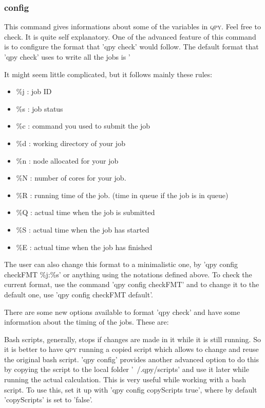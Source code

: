 \documentclass[a4paper,12pt]{article}
\newcommand{\qpy}{\textsc{qpy}}
\begin{document}
\subsubsection{config}

This command gives informations about some of the variables in \qpy{}.
Feel free to check.
It is quite self explanatory.
One of the advanced feature of this command is to configure the format that 'qpy check' would follow.
The default format that 'qpy check' uses to write all the jobs is '%

It might seem little complicated, but it follows mainly these rules:

\begin{itemize}
\item \%j : job ID
\item \%s : job status
\item \%c : command you used to submit the job
\item \%d : working directory of your job
\item \%n : node allocated for your job
\item \%N : number of cores for your job.
\item \%R : running time of the job. (time in queue if the job is in queue)
\item \%Q : actual time when the job is submitted
\item \%S : actual time when the job has started
\item \%E : actual time when the job has finished
\end{itemize}

The user can also change this format to a minimalistic one, by 'qpy config checkFMT \%j:\%s' or anything using the notations defined above. To check the current format, use the command 'qpy config checkFMT' and to change it to the default one, use 'qpy config checkFMT default'.

There are some new options available to format 'qpy check' and have some information about the timing of the jobs. These are:


Bash scripts, generally, stops if changes are made in it while it is still running.
So it is better to have \qpy{} running a copied script which allows to change and reuse the original bash script.
'qpy config' provides another advanced option to do this by copying the script to the local folder '~/.qpy/scripts' and use it later while running the actual calculation.
This is very useful while working with a bash script.
To use this, set it up with 'qpy config copyScripts true', where by default 'copyScripts' is set to 'false'. 
\end{document}
